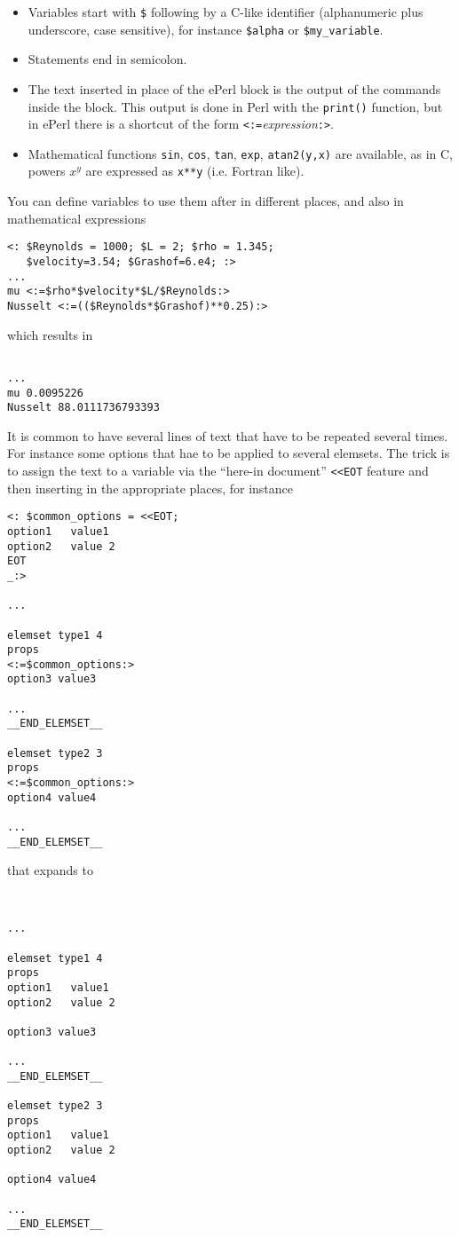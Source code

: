 \begin{itemize}
\item Variables start with \verb+$+ following by a C-like identifier
(alphanumeric plus underscore, case sensitive), for instance \verb+$alpha+ or
\verb+$my_variable+. 
\item Statements end in semicolon. 
\item The text inserted in place of the ePerl block is the output of
the commands inside the block. This output is done in Perl with
the \verb+print()+ function, but in ePerl there is a shortcut of the
form \verb+<:=+\emph{expression}\verb+:>+. 
\item Mathematical functions \verb+sin+, \verb+cos+, \verb+tan+, \verb+exp+,
        \verb+atan2(y,x)+ are available, as in C, powers $x^y$ are expressed
        as \verb+x**y+ (i.e. Fortran like). 
\end{itemize}


You can define variables to use them after in different places, and
also in mathematical expressions

\begin{verbatim}
<: $Reynolds = 1000; $L = 2; $rho = 1.345; 
   $velocity=3.54; $Grashof=6.e4; :>
...
mu <:=$rho*$velocity*$L/$Reynolds:>
Nusselt <:=(($Reynolds*$Grashof)**0.25):>
\end{verbatim}
%
which results in
%
\begin{verbatim}

...
mu 0.0095226
Nusselt 88.0111736793393
\end{verbatim}

 
It is common to have several lines of text that have to be repeated
several times. For instance some options that hae to be applied to
several elemsets. The trick is to assign the text to a variable via
the ``here-in document'' \verb+<<EOT+ feature and then inserting in
the appropriate places, for instance

\begin{verbatim}
<: $common_options = <<EOT;
option1   value1
option2   value 2
EOT
_:>

...

elemset type1 4
props
<:=$common_options:>
option3 value3

...
__END_ELEMSET__

elemset type2 3
props
<:=$common_options:>
option4 value4

...
__END_ELEMSET__
\end{verbatim}
%
that expands to
%
\begin{verbatim}


...

elemset type1 4
props
option1   value1
option2   value 2

option3 value3

...
__END_ELEMSET__

elemset type2 3
props
option1   value1
option2   value 2

option4 value4

...
__END_ELEMSET__
\end{verbatim}


